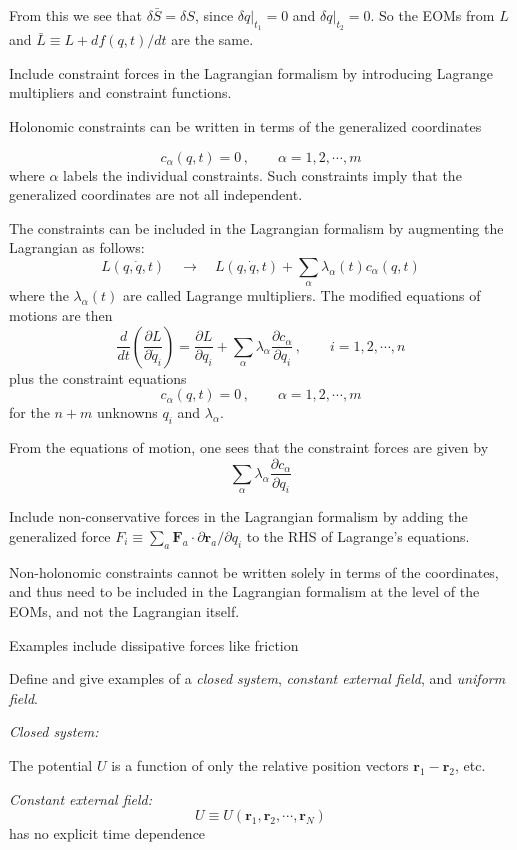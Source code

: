 \documentclass[10pt]{article}
\numberwithin{equation}{section}
\def\be{\begin{equation}}
\def\ee{\end{equation}}
\def\i{\item{}}
\renewcommand{\vec}[1]{\mathbf{#1}}
\begin{document}
From this we see that $\delta \bar{S}=\delta S$, since $\delta
q|_{t_1}=0$ and $\delta q|_{t_2}=0$.  So the EOMs from $L$ and
$\bar{L}\equiv L + df(q,t)/dt$ are the same.

\i Include constraint forces in the Lagrangian formalism by introducing 
Lagrange multipliers and constraint functions.

Holonomic constraints can be written in terms of the generalized coordinates

\be
c_{\alpha}(q, t) = 0\,,
\qquad \alpha = 1,2,\cdots, m
\ee
where $\alpha$ labels the individual constraints.  Such constraints
imply that the generalized coordinates are not all independent.

The constraints can be included in the Lagrangian formalism by augmenting the Lagrangian as follows:
\be
L(q,\dot q, t) 
\quad \rightarrow\quad
L(q,\dot q, t) + \sum_\alpha \lambda_\alpha(t) c_\alpha(q,t)
\ee
where the $\lambda_\alpha(t)$ are called Lagrange multipliers.  The
modified equations of motions are then
\be
\frac{d}{dt}\left(\frac{\partial L}{\partial \dot q_i}\right)
= \frac{\partial L}{\partial q_i} + \sum_\alpha \lambda_\alpha\frac{\partial c_\alpha}{\partial q_i}\,,
\qquad i = 1,2,\cdots, n
\ee
plus the constraint equations
\be
c_\alpha(q,t) = 0\,,
\qquad \alpha =1,2,\cdots, m
\ee
for the $n+m$ unknowns $q_i$ and $\lambda_\alpha$.

From the equations of motion, one sees that the constraint forces are given by
\be
\sum_\alpha \lambda_\alpha\frac{\partial c_\alpha}{\partial q_i}
\ee

\i Include non-conservative forces in the Lagrangian formalism
by adding the generalized force 
$F_i\equiv\sum_a \vec{F}_a\cdot \partial \vec r_a/\partial q_i$
to the RHS of Lagrange's equations.

Non-holonomic constraints cannot be written solely in terms of the
coordinates, and thus need to be included in the Lagrangian formalism
at the level of the EOMs, and not the Lagrangian itself.  

Examples include dissipative forces like friction

\i Define and give examples of a {\em closed system}, 
{\em constant external field}, and {\em uniform field}.

{\em Closed system:}

The potential $U$ is a function of only the relative position vectors
$\vec r_1-\vec r_2$, etc. 

{\em Constant external field:}
\be
U \equiv U(\vec r_1, \vec r_2, \cdots, \vec r_N)
\ee
has no explicit time dependence
\end{document}
